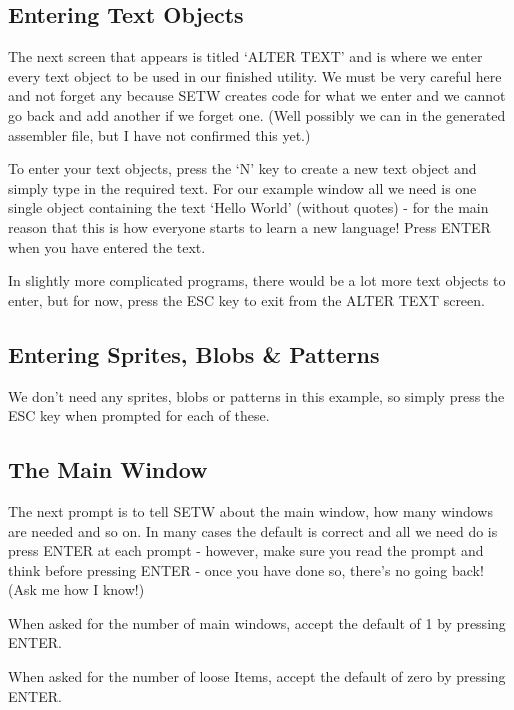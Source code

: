 \subsection{Entering Text Objects}

The next screen that appears is titled `ALTER TEXT' and is where we
            enter every text object to be used in our finished utility. We must be very
            careful here and not forget any because SETW creates code for what we enter
            and we cannot go back and add another if we forget one. (Well possibly we can
            in the generated assembler file, but I have not confirmed this yet.)

To enter your text objects, press the `N' key to create a new text
            object and simply type in the required text. For our example window all we
            need is one single object containing the text `Hello World' (without quotes) -{}
            for the main reason that this is how everyone starts to learn a new language!
            Press ENTER when you have entered the text.

In slightly more complicated programs, there would be a lot more text
            objects to enter, but for now, press the ESC key to exit from the ALTER TEXT
            screen.

\subsection{Entering Sprites, Blobs \& Patterns}

We don't need any sprites, blobs or patterns in this example, so simply
            press the ESC key when prompted for each of these.

\subsection{The Main Window}

The next prompt is to tell SETW about the main window, how many windows
            are needed and so on. In many cases the default is correct and all we need do
            is press ENTER at each prompt -{} however, make sure you read the prompt and
            think before pressing ENTER -{} once you have done so, there's no going back!
            (Ask me how I know!)

When asked for the number of main windows, accept the default of 1 by
            pressing ENTER.

When asked for the number of loose Items, accept the default of zero by
            pressing ENTER.

